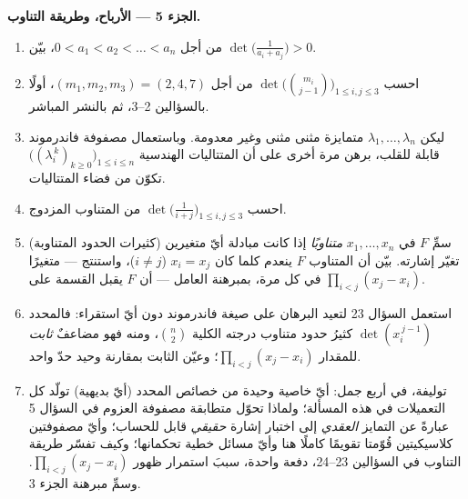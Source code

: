 \begin{problem}
\medskip
\noindent\textbf{الجزء 5 --- الأرباح، وطريقة
التناوب.}
\begin{enumerate}[resume]
  \item من أجل $0 < a_1 < a_2 < \dots < a_n$، بيّن
        $\det\bigl(\frac{1}{a_i + a_j}\bigr) > 0$.
  \item احسب $\det\bigl(\binom{m_i}{j-1}\bigr)_{1 \leq i, j
        \leq 3}$ من أجل $(m_1, m_2, m_3) = (2, 4, 7)$، أولًا
        بالسؤالين 2--3، ثم بالنشر المباشر.
  \item ليكن $\lambda_1, \dots, \lambda_n$ متمايزة مثنى مثنى
        وغير معدومة. وباستعمال مصفوفة فاندرموند قابلة للقلب،
        برهن مرة أخرى على أن المتتاليات الهندسية
        $\bigl((\lambda_i^{\,k})_{k \geq 0}\bigr)_{1 \leq i \leq
        n}$ تكوّن  من فضاء المتتاليات.
  \item احسب $\det\bigl(\frac{1}{i + j}\bigr)_{1 \leq i, j
        \leq 3}$ من المتناوب المزدوج.
  \item (كثيرات الحدود المتناوبة) سمِّ  $F$ في $x_1,
        \dots, x_n$ \emph{متناوبًا} إذا كانت مبادلة أيّ متغيرين
        تغيّر إشارته. بيّن أن  المتناوب $F$
        ينعدم كلما كان $x_i = x_j$ ($i \neq j$)، واستنتج
        --- متغيرًا في كل مرة، بمبرهنة العامل ---
        أن $F$ يقبل القسمة على $\prod_{i<j}(x_j - x_i)$.
  \item استعمل السؤال 23 لتعيد البرهان على صيغة فاندرموند
        دون أيّ استقراء: فالمحدد $\det(x_i^{\,j-1})$ كثيرُ
        حدود متناوب درجته الكلية $\binom n2$،
        ومنه فهو مضاعفٌ \emph{ثابت} للمقدار $\prod_{i<j}(x_j -
        x_i)$؛ وعيّن الثابت بمقارنة وحيد حدّ واحد.
  \item توليفة، في أربع جمل: أيّ خاصية وحيدة من خصائص
        المحدد (أيّ بديهية) تولّد كل
        التعميلات في هذه المسألة؛ ولماذا تحوّل متطابقة مصفوفة
        العزوم في السؤال 5 عبارةً عن التمايز
        \emph{العقدي} إلى اختبار إشارة \emph{حقيقي}
        قابل للحساب؛ وأيّ مصفوفتين كلاسيكيتين قُوّمتا
        تقويمًا كاملًا هنا وأيّ مسائل خطية تحكمانها؛ وكيف
        تفسّر طريقة التناوب في السؤالين
        23--24، دفعة واحدة، سببَ استمرار ظهور $\prod_{i<j}(x_j -
        x_i)$. وسمِّ مبرهنة الجزء 3.
\end{enumerate}
\end{problem}
